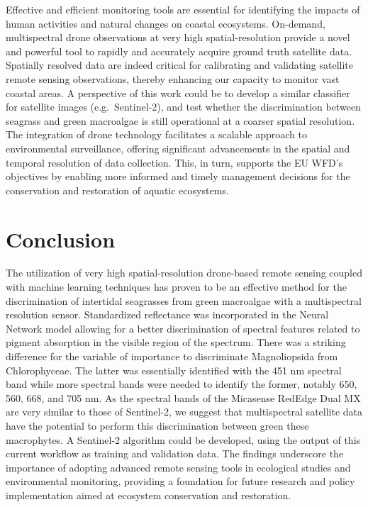 \documentclass[
  number]{elsarticle}
\begin{document}
Effective and efficient monitoring tools are essential for identifying
the impacts of human activities and natural changes on coastal
ecosystems. On-demand, multispectral drone observations at very high
spatial-resolution provide a novel and powerful tool to rapidly and
accurately acquire ground truth satellite data. Spatially resolved data
are indeed critical for calibrating and validating satellite remote
sensing observations, thereby enhancing our capacity to monitor vast
coastal areas. A perspective of this work could be to develop a similar
classifier for satellite images (e.g.~Sentinel-2), and test whether the
discrimination between seagrass and green macroalgae is still
operational at a coarser spatial resolution. The integration of drone
technology facilitates a scalable approach to environmental
surveillance, offering significant advancements in the spatial and
temporal resolution of data collection. This, in turn, supports the EU
WFD's objectives by enabling more informed and timely management
decisions for the conservation and restoration of aquatic ecosystems.

\section{Conclusion}\label{conclusion}

The utilization of very high spatial-resolution drone-based remote
sensing coupled with machine learning techniques has proven to be an
effective method for the discrimination of intertidal seagrasses from
green macroalgae with a multispectral resolution sensor. Standardized
reflectance was incorporated in the Neural Network model allowing for a
better discrimination of spectral features related to pigment absorption
in the visible region of the spectrum. There was a striking difference
for the variable of importance to discriminate Magnoliopsida from
Chlorophyceae. The latter was essentially identified with the 451 nm
spectral band while more spectral bands were needed to identify the
former, notably 650, 560, 668, and 705 nm. As the spectral bands of the
Micasense RedEdge Dual MX are very similar to those of Sentinel-2, we
suggest that multispectral satellite data have the potential to perform
this discrimination between green these macrophytes. A Sentinel-2
algorithm could be developed, using the output of this current workflow
as training and validation data. The findings underscore the importance
of adopting advanced remote sensing tools in ecological studies and
environmental monitoring, providing a foundation for future research and
policy implementation aimed at ecosystem conservation and restoration.


  
\end{document}
